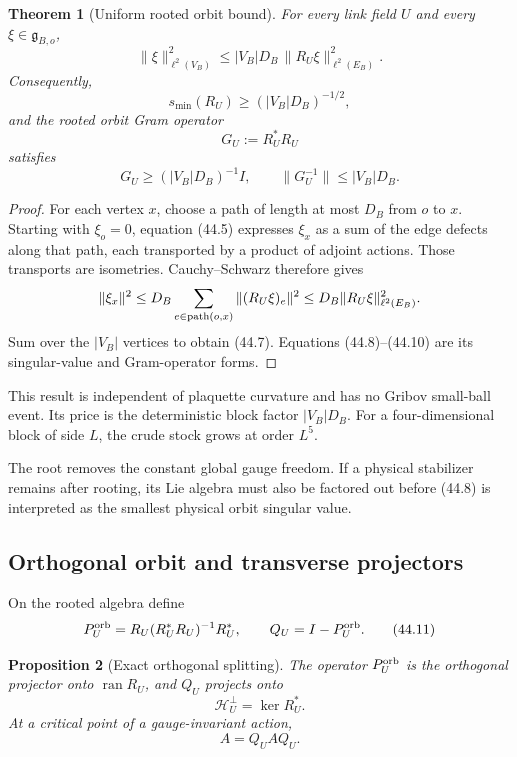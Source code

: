 \documentclass[11pt]{article}
\newtheorem{theorem}{Theorem}[section]
\newtheorem{proposition}[theorem]{Proposition}
\begin{document}
\begin{theorem}[Uniform rooted orbit bound]
\label{thm:v11v44-rooted-bound}
For every link field \(U\) and every
\(\xi\in\mathfrak g_{B,o}\),
\[
 \|\xi\|_{\ell^2(V_B)}^2
 \leq
 |V_B|D_B\,
 \|R_U\xi\|_{\ell^2(E_B)}^2.
 \tag{44.7}
\]
Consequently,
\[
 s_{\min}(R_U)
 \geq(|V_B|D_B)^{-1/2},
 \tag{44.8}
\]
and the rooted orbit Gram operator
\[
 G_U:=R_U^*R_U
 \tag{44.9}
\]
satisfies
\[
 G_U\geq(|V_B|D_B)^{-1}I,
 \qquad
 \|G_U^{-1}\|\leq|V_B|D_B.
 \tag{44.10}
\]
\end{theorem}

\begin{proof}
For each vertex \(x\), choose a path of length at most \(D_B\) from
\(o\) to \(x\).  Starting with \(\xi_o=0\), equation (44.5) expresses
\(\xi_x\) as a sum of the edge defects along that path, each transported
by a product of adjoint actions.  Those transports are isometries.
Cauchy--Schwarz therefore gives
\[
 \|\xi_x\|^2
 \leq
 D_B\sum_{e\in{\rm path}(o,x)}
 \|(R_U\xi)_e\|^2
 \leq
 D_B\|R_U\xi\|_{\ell^2(E_B)}^2.
\]
Sum over the \(|V_B|\) vertices to obtain (44.7).
Equations (44.8)--(44.10) are its singular-value and Gram-operator
forms.
\end{proof}

This result is independent of plaquette curvature and has no Gribov
small-ball event.  Its price is the deterministic block factor
\(|V_B|D_B\).  For a four-dimensional block of side \(L\), the crude
stock grows at order \(L^5\).

The root removes the constant global gauge freedom.  If a physical
stabilizer remains after rooting, its Lie algebra must also be
factored out before (44.8) is interpreted as the smallest physical
orbit singular value.

\subsection{Orthogonal orbit and transverse projectors}

On the rooted algebra define
\[
 P_U^{\rm orb}
 =
 R_U(R_U^*R_U)^{-1}R_U^*,
 \qquad
 Q_U=I-P_U^{\rm orb}.
 \tag{44.11}
\]

\begin{proposition}[Exact orthogonal splitting]
\label{prop:v11v44-splitting}
The operator \(P_U^{\rm orb}\) is the orthogonal projector onto
\(\operatorname{ran}R_U\), and \(Q_U\) projects onto
\[
 \mathcal H_U^\perp=\ker R_U^*.
 \tag{44.12}
\]
At a critical point of a gauge-invariant action,
\[
 A=Q_UAQ_U.
 \tag{44.13}
\]
\end{proposition}
\end{document}
